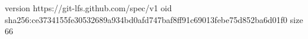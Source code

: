 version https://git-lfs.github.com/spec/v1
oid sha256:ce3734155fe30532689a934bd0afd747baf8ff91c69013febe75d852ba6d01f0
size 66
